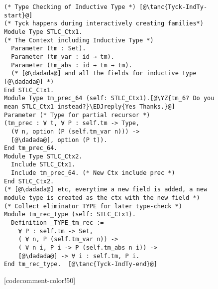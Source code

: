 \begin{figure}

\begin{minipage}{\textwidth}
\begin{multicols}{2}




\begin{lstlisting}
(* Type Checking of Inductive Type *) [@\tanc{Tyck-IndTy-start}@]
(* Tyck happens during interactively creating families*)
Module Type STLC_Ctx1. 
(* The Context including Inductive Type *)
  Parameter (tm : Set).
  Parameter (tm_var : id → tm).
  Parameter (tm_abs : id → tm → tm).
  (* [@\dadada@] and all the fields for inductive type [@\dadada@] *)
End STLC_Ctx1.
Module Type tm_prec_64 (self: STLC_Ctx1).[@\YZ{tm_6? Do you mean STLC_Ctx1 instead?}\EDJreply{Yes Thanks.}@]
Parameter (* Type for partial recursor *)
(tm_prec : ∀ t, ∀ P : self.tm -> Type,
  (∀ n, option (P (self.tm_var n))) -> 
  [@\dadada@], option (P t)).
End tm_prec_64.
Module Type STLC_Ctx2.  
  Include STLC_Ctx1.
  Include tm_prec_64. (* New Ctx include prec *)
End STLC_Ctx2.
(* [@\dadada@] etc, everytime a new field is added, a new 
module type is created as the ctx with the new field *)
(* Collect eliminator TYPE for later type-check *)
Module tm_rec_type (self: STLC_Ctx1).
  Definition _TYPE_tm_rec :=
    ∀ P : self.tm -> Set,
    ( ∀ n, P (self.tm_var n)) ->
    ( ∀ n i, P i -> P (self.tm_abs n i)) ->
    [@\dadada@] -> ∀ i : self.tm, P i.
End tm_rec_type.  [@\tanc{Tyck-IndTy-end}@]
\end{lstlisting}

[codecomment-color!50]




\end{multicols}
\end{minipage}
\end{figure}
